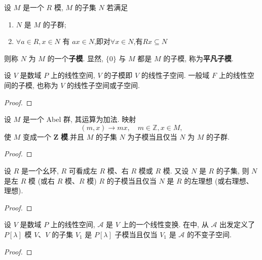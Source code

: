 \documentclass[../../main.tex]{subfiles}%
\begin{document}
\begin{definition}
设 \( M \) 是一个 \( R \) 模, \( M \) 的子集 \( N \) 若满足
\begin{enumerate}[(1)]
\item \( N \) 是 \( M \) 的子群;
\item \( \forall a \in R, x \in N \) 有 \( ax \in N \),即对$\forall x\in N$,有$Rx\subseteq N$
\end{enumerate}
则称 \( N \) 为 \( M \) 的一个\textbf{子模}.
显然, \( \{0\} \) 与 \( M \) 都是 \( M \) 的子模, 称为\textbf{平凡子模}.
\end{definition}

\begin{example}
设 \( V \) 是数域 \( P \) 上的线性空间, \( V \) 的子模即 \( V \) 的线性子空间. 一般域 \( F \) 上的线性空间的子模, 也称为 \( V \) 的线性子空间或子空间.
\end{example}
\begin{proof}

\end{proof}

\begin{example}
设 \( M \) 是一个 Abel 群, 其运算为加法. 映射
\[
(m,x) \to mx, \quad m \in \mathbb{Z}, x \in M,
\]
使 \( M \) 变成一个 \( \boldsymbol{Z} \) \textbf{模}.并且 \( M \) 的子集 \( N \) 为子模当且仅当 \( N \) 为 \( M \) 的子群.
\end{example}
\begin{proof}

\end{proof}

\begin{proposition}
设 \( R \) 是一个幺环, \( R \) 可看成左 \( R \) 模、右 \( R \) 模或 \( R \) 模. 又设 \( N \) 是 \( R \) 的子集, 则 \( N \) 是左 \( R \) 模 (或右 \( R \) 模、\( R \) 模) \( R \) 的子模当且仅当 \( N \) 是 \( R \) 的左理想 (或右理想、理想).
\end{proposition}
\begin{proof}

\end{proof}

\begin{example}
设 \( V \) 是数域 \( P \) 上的线性空间, \( \mathcal{A} \) 是 \( V \) 上的一个线性变换. 在中, 从 \( \mathcal{A} \) 出发定义了 \( P[\lambda] \) 模 \( V \)、\( V \) 的子集 \( V_1 \) 是 \( P[\lambda] \) 子模当且仅当 \( V_1 \) 是 \( \mathcal{A} \) 的不变子空间.
\end{example}
\begin{proof}

\end{proof}
\end{document}
